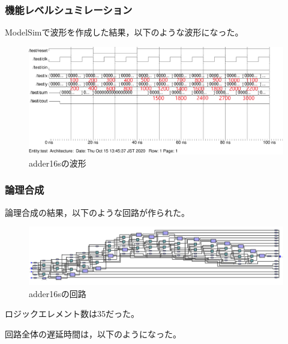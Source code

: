 \subsubsection{機能レベルシュミレーション}
ModelSimで波形を作成した結果，以下のような波形になった。

\begin{figure}[H]
  \centering
  \includegraphics[width=\linewidth]{./src/adder16s/adder16s_wave31.png}
  \caption{adder16sの波形}
\end{figure}

\subsubsection{論理合成}
論理合成の結果，以下のような回路が作られた。

\begin{figure}[H]
  \centering
  \includegraphics[width=\linewidth]{./src/adder16s/adder16s_print.png}
  \caption{adder16sの回路}
\end{figure}

ロジックエレメント数は35だった。

回路全体の遅延時間は，以下のようになった。

